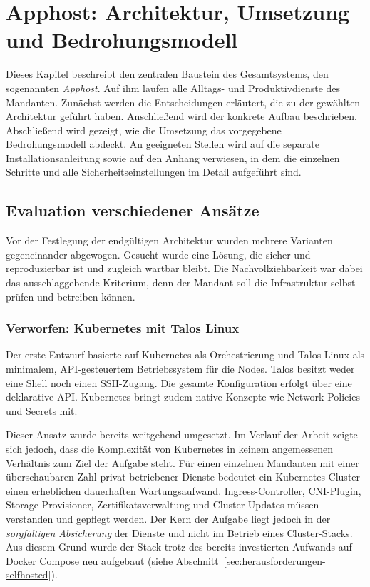 \section{Apphost: Architektur, Umsetzung und Bedrohungsmodell} \label{Apphost}

Dieses Kapitel beschreibt den zentralen Baustein des Gesamtsystems, den
sogenannten \emph{Apphost}. Auf ihm laufen alle Alltags- und Produktivdienste
des Mandanten. Zunächst werden die Entscheidungen erläutert, die zu der
gewählten Architektur geführt haben. Anschließend wird der konkrete Aufbau
beschrieben. Abschließend wird gezeigt, wie die Umsetzung das vorgegebene
Bedrohungsmodell abdeckt. An geeigneten Stellen wird auf die separate
Installationsanleitung sowie auf den Anhang verwiesen, in dem die einzelnen
Schritte und alle Sicherheitseinstellungen im Detail aufgeführt sind.

\subsection{Evaluation verschiedener Ansätze}

Vor der Festlegung der endgültigen Architektur wurden mehrere Varianten
gegeneinander abgewogen. Gesucht wurde eine Lösung, die sicher und
reproduzierbar ist und zugleich wartbar bleibt. Die Nachvollziehbarkeit war
dabei das ausschlaggebende Kriterium, denn der Mandant soll die Infrastruktur
selbst prüfen und betreiben können.

\subsubsection*{Verworfen: Kubernetes mit Talos Linux}

Der erste Entwurf basierte auf Kubernetes als Orchestrierung und Talos Linux
als minimalem, \ac{API}-gesteuertem Betriebssystem für die Nodes. Talos
besitzt weder eine Shell noch einen \ac{SSH}-Zugang. Die gesamte Konfiguration
erfolgt über eine deklarative \ac{API}. Kubernetes bringt zudem native
Konzepte wie Network Policies und Secrets mit.

Dieser Ansatz wurde bereits weitgehend umgesetzt. Im Verlauf der Arbeit zeigte
sich jedoch, dass die Komplexität von Kubernetes in keinem angemessenen
Verhältnis zum Ziel der Aufgabe steht. Für einen einzelnen Mandanten mit einer
überschaubaren Zahl privat betriebener Dienste bedeutet ein Kubernetes-Cluster
einen erheblichen dauerhaften Wartungsaufwand. Ingress-Controller,
\ac{CNI}-Plugin, Storage-Provisioner, Zertifikatsverwaltung und
Cluster-Updates müssen verstanden und gepflegt werden. Der Kern der Aufgabe
liegt jedoch in der \emph{sorgfältigen Absicherung} der Dienste und nicht im
Betrieb eines Cluster-Stacks. Aus diesem Grund wurde der Stack trotz des
bereits investierten Aufwands auf Docker Compose neu aufgebaut (siehe
Abschnitt~\ref{sec:herausforderungen-selfhosted}).

